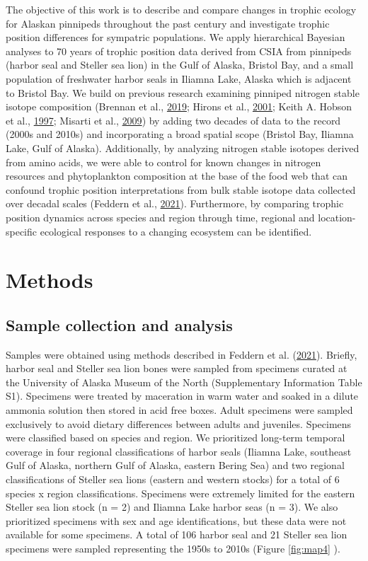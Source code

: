 \documentclass [11pt, proquest] {uwthesis}[2015/03/03]
\begin{document}
The objective of this work is to describe and compare changes in trophic
ecology for Alaskan pinnipeds throughout the past century and
investigate trophic position differences for sympatric populations. We
apply hierarchical Bayesian analyses to 70 years of trophic position
data derived from CSIA from pinnipeds (harbor seal and Steller sea lion)
in the Gulf of Alaska, Bristol Bay, and a small population of freshwater
harbor seals in Iliamna Lake, Alaska which is adjacent to Bristol Bay.
We build on previous research examining pinniped nitrogen stable isotope
composition (Brennan et al., \protect\hyperlink{ref-Brennan2019}{2019};
Hirons et al., \protect\hyperlink{ref-Hirons2001}{2001}; Keith A. Hobson
et al., \protect\hyperlink{ref-Hobson1997}{1997}; Misarti et al.,
\protect\hyperlink{ref-Misarti2009}{2009}) by adding two decades of data
to the record (2000s and 2010s) and incorporating a broad spatial scope
(Bristol Bay, Iliamna Lake, Gulf of Alaska). Additionally, by analyzing
nitrogen stable isotopes derived from amino acids, we were able to
control for known changes in nitrogen resources and phytoplankton
composition at the base of the food web that can confound trophic
position interpretations from bulk stable isotope data collected over
decadal scales (Feddern et al.,
\protect\hyperlink{ref-Feddern2021}{2021}). Furthermore, by comparing
trophic position dynamics across species and region through time,
regional and location-specific ecological responses to a changing
ecosystem can be identified.

\section{Methods}\label{methods-3}

\subsection{Sample collection and
analysis}\label{sample-collection-and-analysis-2}

Samples were obtained using methods described in Feddern et al.
(\protect\hyperlink{ref-Feddern2021}{2021}). Briefly, harbor seal and
Steller sea lion bones were sampled from specimens curated at the
University of Alaska Museum of the North (Supplementary Information
Table S1). Specimens were treated by maceration in warm water and soaked
in a dilute ammonia solution then stored in acid free boxes. Adult
specimens were sampled exclusively to avoid dietary differences between
adults and juveniles. Specimens were classified based on species and
region. We prioritized long-term temporal coverage in four regional
classifications of harbor seals (Iliamna Lake, southeast Gulf of Alaska,
northern Gulf of Alaska, eastern Bering Sea) and two regional
classifications of Steller sea lions (eastern and western stocks) for a
total of 6 species x region classifications. Specimens were extremely
limited for the eastern Steller sea lion stock (n = 2) and Iliamna Lake
harbor seas (n = 3). We also prioritized specimens with sex and age
identifications, but these data were not available for some specimens. A
total of 106 harbor seal and 21 Steller sea lion specimens were sampled
representing the 1950s to 2010s (Figure \ref{fig:map4} ).
\end{document}
